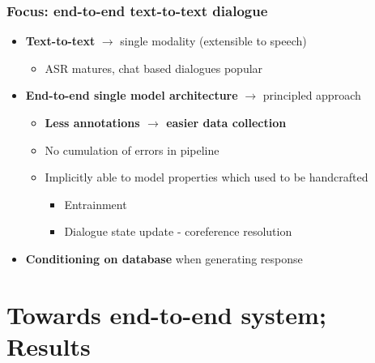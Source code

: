 \documentclass[10pt, compress,british,xcolor={svgnames,dvipsnames,x11names},trans]{beamer}
\begin{document}
\begin{frame}\frametitle{Focus: end-to-end text-to-text dialogue}
    \begin{itemize}
        \item {\bf Text-to-text} $\longrightarrow$ single modality (extensible to speech)
            \begin{itemize}
                \item ASR matures, chat based dialogues popular
            \end{itemize}
        \item {\bf End-to-end single model architecture} $\longrightarrow$ principled approach
            \begin{itemize}
                \item {\bf Less annotations $\longrightarrow$ easier data collection}
                \item No cumulation of errors in pipeline
                \item Implicitly able to model properties which used to be handcrafted 
                \begin{itemize}
                    \item Entrainment
                    \item Dialogue state update - coreference resolution
                \end{itemize}
            \end{itemize}
        \item {\bf Conditioning on database} when generating response 
    \end{itemize}
\end{frame}

\section{Towards end-to-end system; Results}  %
\end{document}
